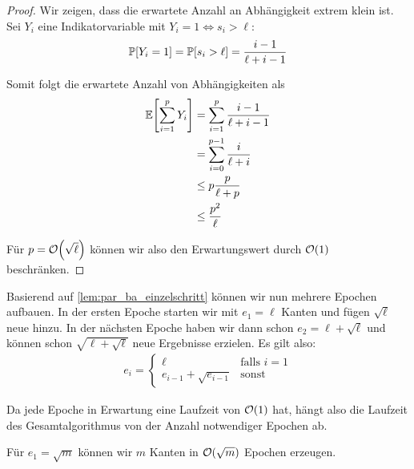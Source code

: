\begin{proof}
    Wir zeigen, dass die erwartete Anzahl an Abhängigkeit extrem klein ist.
    Sei $Y_i$ eine Indikatorvariable mit $Y_i = 1 \Leftrightarrow s_i > \ell$:
    \begin{align}
        \mathbb{P}\!\left[Y_i = 1\right] = \mathbb{P}\!\left[s_i > \ell\right] = \frac{i - 1}{\ell + i - 1}
    \end{align}

    \noindent
    Somit folgt die erwartete Anzahl von Abhängigkeiten als
    \begin{align}
        \mathbb{E}\!\left[\sum_{i=1}^p Y_i\right] & = \sum_{i=1}^{p} \frac{i - 1}{\ell + i - 1} \\
                                & = \sum_{i=0}^{p-1} \frac{i}{\ell + i}       \\
                                & \le p \frac{p}{\ell + p}                    \\
                                & \le \frac{p^2}{\ell}
    \end{align}

    \noindent
    Für $p = \mathcal{O}\!\left(\sqrt{\ell}\right)$ können wir also den Erwartungswert durch $\mathcal{O}\!\left(1\right)$  beschränken.
\end{proof}

Basierend auf \cref{lem:par_ba_einzelschritt} können wir nun mehrere Epochen aufbauen.
In der ersten Epoche starten wir mit $e_1 = \ell$ Kanten und fügen $\sqrt{\ell}$ neue hinzu.
In der nächsten Epoche haben wir dann schon $e_2 = \ell + \sqrt{\ell}$ und können schon $\sqrt{\ell + \sqrt{\ell}}$ neue Ergebnisse erzielen.
Es gilt also:
\begin{align}
    e_i = \begin{cases}
        \ell                     & \text{falls } i = 1 \\
        e_{i-1} + \sqrt{e_{i-1}} & \text{sonst}
    \end{cases}
\end{align}

Da jede Epoche in Erwartung eine Laufzeit von $\mathcal{O}\!\left(1\right)$ hat, hängt also die Laufzeit des Gesamtalgorithmus von der Anzahl notwendiger Epochen ab.

\begin{lemma}
    Für $e_1 = \sqrt{m}$ können wir $m$ Kanten in $\mathcal{O}\!\left(\sqrt{m}\right)$ Epochen erzeugen.
\end{lemma}


